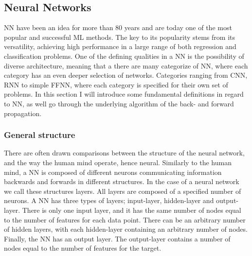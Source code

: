 \subsection{Neural Networks}\label{sec:NN}
\ac{NN} have been an idea for more than 80 years and are today one of the 
most popular and successful \ac{ML} methods. The key to its popularity stems from
its versatility, achieving high performance in a large range of both regression 
and classification problems. One of the defining qualities in a \ac{NN} is the 
possibility of diverse architecture, meaning that a there are many
categorize of \ac{NN}, where each category has an even deeper selection of
networks. Categories ranging from \ac{CNN}, \ac{RNN} to simple \ac{FFNN}, where each
category is specified for their own set of problems. In this section I will introduce 
some fundamental definitions in regard to \ac{NN}, as well go through the underlying 
algorithm of the back- and forward propagation.

\subsubsection*{General structure}
There are often drawn comparisons between the structure of the neural network, 
and the way the human mind operate, hence neural. Similarly to the human mind, a \ac{NN} is 
composed of different neurons communicating information backwards and forwards in different 
structures. In the case of a neural network we call these structures layers. All layers
are composed of a specified number of neurons. A \ac{NN} has three types of layers;
input-layer, hidden-layer and output-layer. There is only one input layer, and it has
the same number of nodes equal to the number of features for each data point. 
There can be an arbitrary number of hidden layers, with each hidden-layer containing
an arbitrary number of nodes. Finally, the \ac{NN} has an output layer. The output-layer
contains a number of nodes equal to the number of features for the target.
\\

